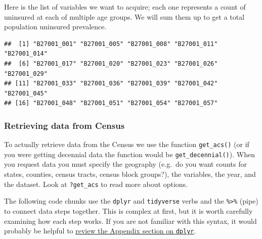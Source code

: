 \documentclass[
]{book}
\newenvironment{Shaded}{\begin{snugshade}}{\end{snugshade}}
\newcommand{\CommentTok}[1]{\textcolor[rgb]{0.56,0.35,0.01}{\textit{#1}}}
\newcommand{\FunctionTok}[1]{\textcolor[rgb]{0.13,0.29,0.53}{\textbf{#1}}}
\newcommand{\NormalTok}[1]{#1}
\newcommand{\OtherTok}[1]{\textcolor[rgb]{0.56,0.35,0.01}{#1}}
\newcommand{\SpecialCharTok}[1]{\textcolor[rgb]{0.81,0.36,0.00}{\textbf{#1}}}
\newcommand{\StringTok}[1]{\textcolor[rgb]{0.31,0.60,0.02}{#1}}
\begin{document}
\begin{Shaded}
\end{Shaded}

Here is the list of variables we want to acquire; each one represents a count of uninsured at each of multiple age groups. We will sum them up to get a total population uninsured prevalence.

\begin{verbatim}
##  [1] "B27001_001" "B27001_005" "B27001_008" "B27001_011" "B27001_014"
##  [6] "B27001_017" "B27001_020" "B27001_023" "B27001_026" "B27001_029"
## [11] "B27001_033" "B27001_036" "B27001_039" "B27001_042" "B27001_045"
## [16] "B27001_048" "B27001_051" "B27001_054" "B27001_057"
\end{verbatim}

\hypertarget{retrieving-data-from-census}{%
\subsubsection{Retrieving data from Census}\label{retrieving-data-from-census}}

To actually retrieve data from the Census we use the function \texttt{get\_acs()} (or if you were getting decennial data the function would be \texttt{get\_decennial()}). When you request data you must specify the geography (e.g.~do you want counts for states, counties, census tracts, census block groups?), the variables, the year, and the dataset. Look at \texttt{?get\_acs} to read more about options.

The following code chunks use the \texttt{dplyr} and \texttt{tidyverse} verbs and the \texttt{\%\textgreater{}\%} (pipe) to connect data steps together. This is complex at first, but it is worth carefully examining how each step works. If you are not familiar with this syntax, it would probably be helpful to \protect\hyperlink{dplyr}{review the Appendix section on \texttt{dplyr}}.
\end{document}
